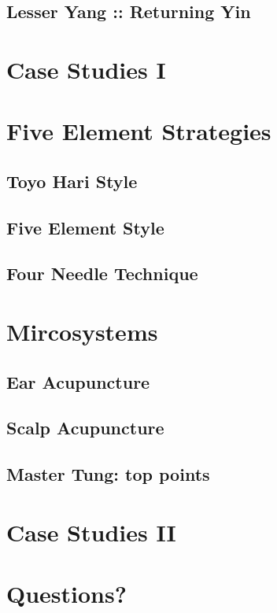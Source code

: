 \subsection{Lesser Yang :: Returning Yin}

\section{Case Studies I}

\section{Five Element Strategies}

\subsection{Toyo Hari Style}

\subsection{Five Element Style}

\subsection{Four Needle Technique}

\section{Mircosystems}

\subsection{Ear Acupuncture}

\subsection{Scalp Acupuncture}

\subsection{Master Tung: top points}

\section{Case Studies II}

\section{Questions?} 

\begin{frame}
\end{frame}


